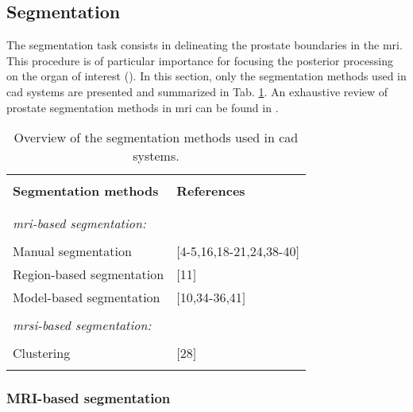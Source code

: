 

\subsection{Segmentation} \label{subsec:segmentation}

The segmentation task consists in delineating the prostate boundaries in the \ac{mri}. This procedure is of particular importance for focusing the posterior processing on the organ of interest (\cite{Ghose2012}). In this section, only the segmentation methods used in \ac{cad} systems are presented and summarized in Tab. \ref{tab:seg}. An exhaustive review of prostate segmentation methods in \ac{mri} can be found in \cite{Ghose2012}.

\begin{table}
	\caption{Overview of the segmentation methods used in \ac{cad} systems.}
	\small
	\begin{tabular}{p{.65\linewidth} p{.25\linewidth}}
		\hline \\ [-1.5ex]
		\textbf{Segmentation methods} & \textbf{References} \\ \\ [-1.5ex]
		\hline \\ [-1.5ex]
		\textit{\ac{mri}-based segmentation:} & \\ \\ [-1.5ex]
		\quad Manual segmentation & $[$4-5,16,18-21,24,38-40$]$ \\
		\quad Region-based segmentation & $[$11$]$ \\
		\quad Model-based segmentation & $[$10,34-36,41$]$ \\ \\ [-1.5ex]
		\textit{\ac{mrsi}-based segmentation:} & \\ \\ [-1.5ex]
		\quad Clustering & $[$28$]$ \\ \\ [-1.5ex]
		\hline
	\end{tabular}
	\label{tab:seg}
\end{table}

\subsubsection{MRI-based segmentation}

